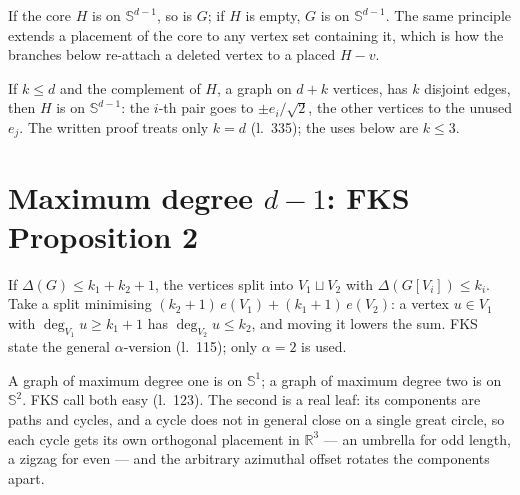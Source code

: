 \begin{corollary}
  \label{cor:degenerate}
  \leanok
  If the core $H$ is on $\mathbb{S}^{d-1}$, so is $G$; if $H$ is empty, $G$ is on
  $\mathbb{S}^{d-1}$. The same principle extends a placement of the core to any vertex set
  containing it, which is how the branches below re-attach a deleted vertex to a placed
  $H - v$.
\end{corollary}

\begin{lemma}
  \label{lem:cross}
  \leanok
  If $k \le d$ and the complement of $H$, a graph on $d + k$ vertices, has $k$ disjoint
  edges, then $H$ is on $\mathbb{S}^{d-1}$: the $i$-th pair goes to $\pm e_i/\sqrt 2$, the
  other vertices to the unused $e_j$. The written proof treats only $k = d$ (l.~335); the
  uses below are $k \le 3$.
\end{lemma}

\section{Maximum degree $d - 1$: FKS Proposition 2}

\begin{lemma}
  \label{lem:lovasz}
  \leanok
  If $\Delta(G) \le k_1 + k_2 + 1$, the vertices split into $V_1 \sqcup V_2$ with
  $\Delta(G[V_i]) \le k_i$. Take a split minimising $(k_2+1)\,e(V_1) + (k_1+1)\,e(V_2)$: a
  vertex $u \in V_1$ with $\deg_{V_1} u \ge k_1 + 1$ has $\deg_{V_2} u \le k_2$, and moving it
  lowers the sum. FKS state the general $\alpha$-version (l.~115); only $\alpha = 2$ is used.
\end{lemma}

\begin{lemma}[Bases $d = 2$ and $d = 3$]
  \label{lem:maxdeg-base}
  \leanok
  A graph of maximum degree one is on $\mathbb{S}^1$; a graph of maximum degree two is on
  $\mathbb{S}^2$. FKS call both easy (l.~123). The second is a real leaf: its components are
  paths and cycles, and a cycle does not in general close on a single great circle, so each
  cycle gets its own orthogonal placement in $\mathbb{R}^3$ --- an umbrella for odd length, a
  zigzag for even --- and the arbitrary azimuthal offset rotates the components apart.
\end{lemma}

